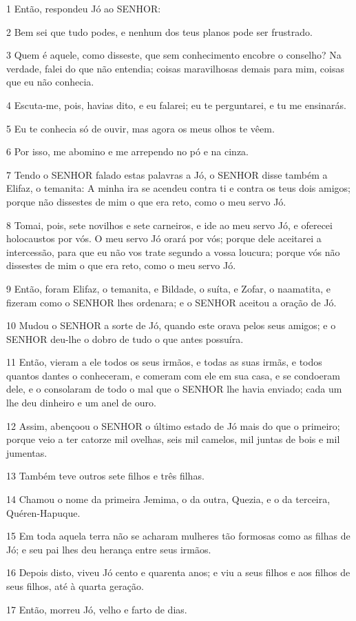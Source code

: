 \par 1 Então, respondeu Jó ao SENHOR:
\par 2 Bem sei que tudo podes, e nenhum dos teus planos pode ser frustrado.
\par 3 Quem é aquele, como disseste, que sem conhecimento encobre o conselho? Na verdade, falei do que não entendia; coisas maravilhosas demais para mim, coisas que eu não conhecia.
\par 4 Escuta-me, pois, havias dito, e eu falarei; eu te perguntarei, e tu me ensinarás.
\par 5 Eu te conhecia só de ouvir, mas agora os meus olhos te vêem.
\par 6 Por isso, me abomino e me arrependo no pó e na cinza.
\par 7 Tendo o SENHOR falado estas palavras a Jó, o SENHOR disse também a Elifaz, o temanita: A minha ira se acendeu contra ti e contra os teus dois amigos; porque não dissestes de mim o que era reto, como o meu servo Jó.
\par 8 Tomai, pois, sete novilhos e sete carneiros, e ide ao meu servo Jó, e oferecei holocaustos por vós. O meu servo Jó orará por vós; porque dele aceitarei a intercessão, para que eu não vos trate segundo a vossa loucura; porque vós não dissestes de mim o que era reto, como o meu servo Jó.
\par 9 Então, foram Elifaz, o temanita, e Bildade, o suíta, e Zofar, o naamatita, e fizeram como o SENHOR lhes ordenara; e o SENHOR aceitou a oração de Jó.
\par 10 Mudou o SENHOR a sorte de Jó, quando este orava pelos seus amigos; e o SENHOR deu-lhe o dobro de tudo o que antes possuíra.
\par 11 Então, vieram a ele todos os seus irmãos, e todas as suas irmãs, e todos quantos dantes o conheceram, e comeram com ele em sua casa, e se condoeram dele, e o consolaram de todo o mal que o SENHOR lhe havia enviado; cada um lhe deu dinheiro e um anel de ouro.
\par 12 Assim, abençoou o SENHOR o último estado de Jó mais do que o primeiro; porque veio a ter catorze mil ovelhas, seis mil camelos, mil juntas de bois e mil jumentas.
\par 13 Também teve outros sete filhos e três filhas.
\par 14 Chamou o nome da primeira Jemima, o da outra, Quezia, e o da terceira, Quéren-Hapuque.
\par 15 Em toda aquela terra não se acharam mulheres tão formosas como as filhas de Jó; e seu pai lhes deu herança entre seus irmãos.
\par 16 Depois disto, viveu Jó cento e quarenta anos; e viu a seus filhos e aos filhos de seus filhos, até à quarta geração.
\par 17 Então, morreu Jó, velho e farto de dias.


